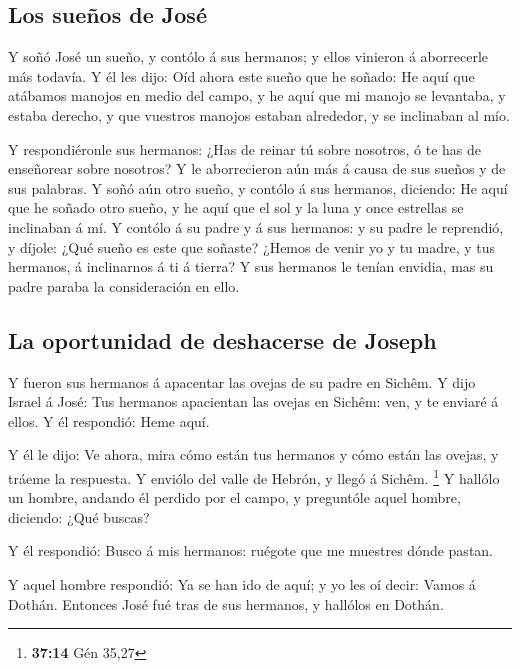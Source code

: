 \hypertarget{los-sueuxf1os-de-josuxe9}{%
\subsection{Los sueños de José}\label{los-sueuxf1os-de-josuxe9}}

 Y soñó José un sueño, y contólo á sus hermanos; y ellos
vinieron á aborrecerle más todavía.  Y él les dijo: Oíd
ahora este sueño que he soñado:  He aquí que atábamos
manojos en medio del campo, y he aquí que mi manojo se levantaba, y
estaba derecho, y que vuestros manojos estaban alrededor, y se
inclinaban al mío.

 Y respondiéronle sus hermanos: ¿Has de reinar tú sobre
nosotros, ó te has de enseñorear sobre nosotros? Y le aborrecieron aún
más á causa de sus sueños y de sus palabras.  Y soñó aún
otro sueño, y contólo á sus hermanos, diciendo: He aquí que he soñado
otro sueño, y he aquí que el sol y la luna y once estrellas se
inclinaban á mí.  Y contólo á su padre y á sus hermanos: y
su padre le reprendió, y díjole: ¿Qué sueño es este que soñaste? ¿Hemos
de venir yo y tu madre, y tus hermanos, á inclinarnos á ti á tierra?
 Y sus hermanos le tenían envidia, mas su padre paraba la
consideración en ello.

\hypertarget{la-oportunidad-de-deshacerse-de-joseph}{%
\subsection{La oportunidad de deshacerse de
Joseph}\label{la-oportunidad-de-deshacerse-de-joseph}}

 Y fueron sus hermanos á apacentar las ovejas de su padre
en Sichêm.  Y dijo Israel á José: Tus hermanos apacientan
las ovejas en Sichêm: ven, y te enviaré á ellos. Y él respondió: Heme
aquí.

 Y él le dijo: Ve ahora, mira cómo están tus hermanos y
cómo están las ovejas, y tráeme la respuesta. Y enviólo del valle de
Hebrón, y llegó á Sichêm. \footnote{\textbf{37:14} Gén 35,27}
 Y hallólo un hombre, andando él perdido por el campo, y
preguntóle aquel hombre, diciendo: ¿Qué buscas?

 Y él respondió: Busco á mis hermanos: ruégote que me
muestres dónde pastan.

 Y aquel hombre respondió: Ya se han ido de aquí; y yo les
oí decir: Vamos á Dothán. Entonces José fué tras de sus hermanos, y
hallólos en Dothán.


